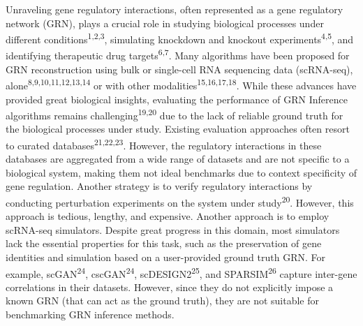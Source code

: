 Unraveling gene regulatory interactions, often represented as a gene regulatory network (GRN), plays a crucial role in studying biological processes under different conditions\textsuperscript{1,2,3}, simulating knockdown and knockout experiments\textsuperscript{4,5}, and identifying therapeutic drug targets\textsuperscript{6,7}. Many algorithms have been proposed for GRN reconstruction using bulk or single-cell RNA sequencing data (scRNA-seq), alone\textsuperscript{8,9,10,11,12,13,14} or with other modalities\textsuperscript{15,16,17,18}. While these advances have provided great biological insights, evaluating the performance of GRN Inference algorithms remains challenging\textsuperscript{19,20} due to the lack of reliable ground truth for the biological processes under study. Existing evaluation approaches often resort to curated databases\textsuperscript{21,22,23}. However, the regulatory interactions in these databases are aggregated from a wide range of datasets and are not specific to a biological system, making them not ideal benchmarks due to context specificity of gene regulation. Another strategy is to verify regulatory interactions by conducting perturbation experiments on the system under study\textsuperscript{20}. However, this approach is tedious, lengthy, and expensive. Another approach is to employ scRNA-seq simulators. Despite great progress in this domain, most simulators lack the essential properties for this task, such as the preservation of gene identities and simulation based on a user-provided ground truth GRN. For example, scGAN\textsuperscript{24}, cscGAN\textsuperscript{24}, scDESIGN2\textsuperscript{25}, and SPARSIM\textsuperscript{26} capture inter-gene correlations in their datasets. However, since they do not explicitly impose a known GRN (that can act as the ground truth), they are not suitable for benchmarking GRN inference methods.

